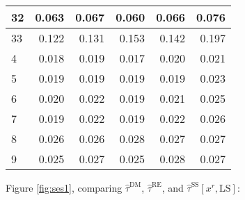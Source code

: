 \documentclass[12pt]{article}\usepackage[]{graphicx}\usepackage[]{xcolor}
\newcommand{\predr}{x^r}
\newcommand{\tsd}{\hat{\tau}^{\mathrm{DM}}}
\newcommand{\tss}{\hat{\tau}^{\mathrm{SS}}}
\newcommand{\trc}{\tss[\predr, \mathrm{LS}]}
\newcommand{\trebar}{\hat{\tau}^{\mathrm{RE}}}
\begin{document}
\begin{table}
\begin{tabular}[t]{l|r|r|r|r|r}
\hline
32 & 0.063 & 0.067 & 0.060 & 0.066 & 0.076\\
\hline
33 & 0.122 & 0.131 & 0.153 & 0.142 & 0.197\\
\hline
4 & 0.018 & 0.019 & 0.017 & 0.020 & 0.021\\
\hline
5 & 0.019 & 0.019 & 0.019 & 0.019 & 0.023\\
\hline
6 & 0.020 & 0.022 & 0.019 & 0.021 & 0.025\\
\hline
7 & 0.019 & 0.022 & 0.019 & 0.022 & 0.026\\
\hline
8 & 0.026 & 0.026 & 0.028 & 0.027 & 0.027\\
\hline
9 & 0.025 & 0.027 & 0.025 & 0.028 & 0.027\\
\hline
\end{tabular}
\end{table}



Figure \ref{fig:ses1}, comparing
$\tsd$,
$\trebar$, and $\trc$:
\end{document}
